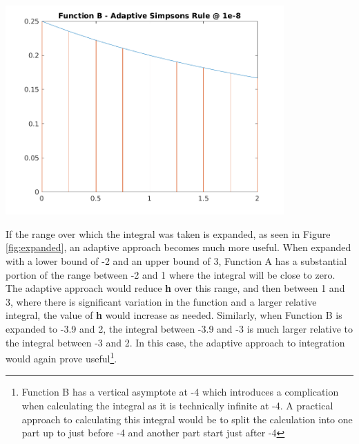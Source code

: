 \documentclass[a4paper]{article}
\begin{document}
\begin{center}
	\includegraphics[width=0.8\textwidth]{../output/b_adaptive_simpsons_8.png}
	\label{fig:b_adap8}
\end{center}


If the range over which the integral was taken is expanded, as seen in Figure \ref{fig:expanded}, an adaptive approach becomes much more useful. When expanded with a lower bound of -2 and an upper bound of 3, Function A has a substantial portion of the range between -2 and 1 where the integral will be close to zero. The adaptive approach would reduce \textbf{h} over this range, and then between 1 and 3,  where there is significant variation in the function and a larger relative integral, the value of \textbf{h} would increase as needed. Similarly, when Function B is expanded to -3.9 and 2, the integral between -3.9 and -3 is much larger relative to the integral between -3 and 2. In this case, the adaptive approach to integration would again prove useful\footnote{Function B has a vertical asymptote at -4 which introduces a complication when calculating the integral as it is technically infinite at -4. A practical approach to calculating this integral would be to split the calculation into one part up to just before -4 and another part start just after -4}.
\end{document}
